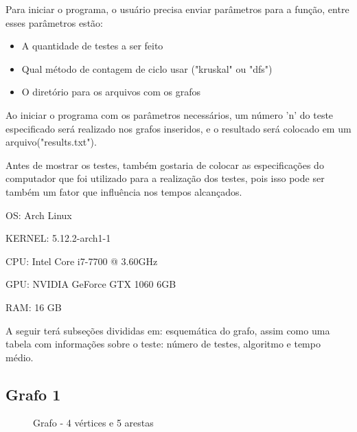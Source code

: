 \documentclass[12pt]{article}
\begin{document}
  Para iniciar o programa, o usuário precisa enviar parâmetros para a função, entre esses parâmetros estão:

  \begin{itemize}
    \item A quantidade de testes a ser feito
    \item Qual método de contagem de ciclo usar ("kruskal" ou "dfs")
    \item O diretório para os arquivos com os grafos
  \end{itemize}

  Ao iniciar o programa com os parâmetros necessários, um número 'n' do teste especificado 
  será realizado nos grafos inseridos, e o resultado será colocado em um arquivo("results.txt").

  Antes de mostrar os testes, também gostaria de colocar as especificações do computador 
  que foi utilizado para a realização dos testes, pois isso pode ser também um fator 
  que influência nos tempos alcançados.

  OS: Arch Linux
  
  KERNEL: 5.12.2-arch1-1
  
  CPU: Intel Core i7-7700 @ 3.60GHz
  
  GPU: NVIDIA GeForce GTX 1060 6GB
  
  RAM: 16 GB
  
  A seguir terá subseções divididas em: esquemática do grafo, assim como 
  uma tabela com informações sobre o teste: número de testes, algoritmo e
  tempo médio.

  \newpage 

  \subsection{Grafo 1}

  \begin{figure}[ht]
    \centering
    \caption{Grafo  - 4 vértices e 5 arestas }

  \end{figure}
\end{document}
